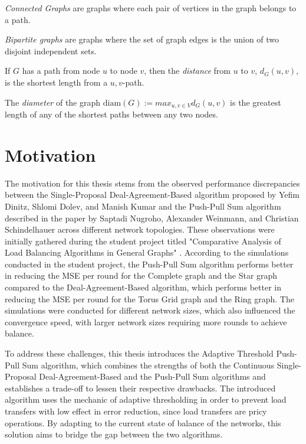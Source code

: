\begin{definition}
    \textit{Connected Graphs} are graphs where each pair of vertices in the graph belongs to a path.
\end{definition}

\begin{definition}
    \textit{Bipartite graphs} are graphs where the set of graph edges is the union of two disjoint independent sets.
\end{definition}

\begin{definition}
    If $G$ has a path from node $u$ to node $v$, then the \textit{distance} from $u$ to $v$, $d_G(u,v)$, is the shortest length from a $u,v$-path.
    
    The \textit{diameter} of the graph $\text{diam} (G) := max_{u,v\in V}d_G(u,v)$ is the greatest length of any of the shortest paths between any two nodes.
\end{definition}

\section{Motivation}\label{sec:motivation}
The motivation for this thesis stems from the observed performance discrepancies between the Single-Proposal Deal-Agreement-Based algorithm proposed by Yefim Dinitz, Shlomi Dolev, and Manish Kumar \cite{Dinitz2023DAB} and the Push-Pull Sum algorithm described in the paper by Saptadi Nugroho, Alexander Weinmann, and Christian Schindelhauer \cite{nugroho2023PushPullSumDataAg} across different network topologies. These observations were initially gathered during the student project titled "Comparative Analysis of Load Balancing Algorithms in General Graphs" \cite{Bayazitoglu}. According to the simulations conducted in the student project, the Push-Pull Sum algorithm performs better in reducing the MSE per round for the Complete graph and the Star graph compared to the Deal-Agreement-Based algorithm, which performs better in reducing the MSE per round for the Torus Grid graph and the Ring graph. The simulations were conducted for different network sizes, which also influenced the convergence speed, with larger network sizes requiring more rounds to achieve balance.

To address these challenges, this thesis introduces the Adaptive Threshold Push-Pull Sum algorithm, which combines the strengths of both the Continuous Single-Proposal Deal-Agreement-Based and the Push-Pull Sum algorithms and establishes a trade-off to lessen their respective drawbacks. The introduced algorithm uses the mechanic of adaptive thresholding in order to prevent load transfers with low effect in error reduction, since load transfers are pricy operations. By adapting to the current state of balance of the networks, this solution aims to bridge the gap between the two algorithms.

